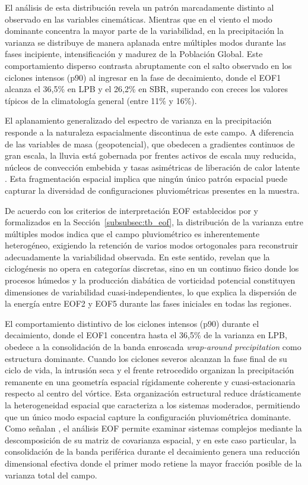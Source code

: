 El análisis de esta distribución revela un patrón marcadamente distinto al observado en las variables cinemáticas. Mientras que en el viento el modo dominante concentra la mayor parte de la variabilidad, en la precipitación la varianza se distribuye de manera aplanada entre múltiples modos durante las fases incipiente, intensificación y madurez de la Población Global.
Este comportamiento disperso contrasta abruptamente con el salto observado en los ciclones intensos (p90) al ingresar en la fase de decaimiento, donde el EOF1 alcanza el 36,5\% en LPB y el 26,2\% en SBR, superando con creces los valores típicos de la climatología general (entre 11\% y 16\%).

El aplanamiento generalizado del espectro de varianza en la precipitación responde a la naturaleza espacialmente discontinua de este campo. 
A diferencia de las variables de masa (geopotencial), que obedecen a gradientes continuos de gran escala, la lluvia está gobernada por frentes activos de escala muy reducida, núcleos de convección embebida y tasas asimétricas de liberación de calor latente \citep{oertel2021warm}. 
Esta fragmentación espacial implica que ningún único patrón espacial puede capturar la diversidad de configuraciones pluviométricas presentes en la muestra. 

De acuerdo con los criterios de interpretación EOF establecidos por \citet{hannachi2007empirical} y formalizados en la Sección~\ref{subsubsec:tb_eof}, la distribución de la varianza entre múltiples modos indica que el campo pluviométrico es inherentemente heterogéneo, exigiendo la retención de varios modos ortogonales para reconstruir adecuadamente la variabilidad observada.
En este sentido, \citet{graf2017objective} revelan que la ciclogénesis no opera en categorías discretas, sino en un continuo físico donde los procesos húmedos y la producción diabática de vorticidad potencial constituyen dimensiones de variabilidad cuasi-independientes, lo que explica la dispersión de la energía entre EOF2 y EOF5 durante las fases iniciales en todas las regiones.

El comportamiento distintivo de los ciclones intensos (p90) durante el decaimiento, donde el EOF1 concentra hasta el 36,5\% de la varianza en LPB, obedece a la consolidación de la banda enroscada \textit{wrap-around precipitation} como estructura dominante. 
Cuando los ciclones severos alcanzan la fase final de su ciclo de vida, la intrusión seca y el frente retrocedido organizan la precipitación remanente en una geometría espacial rígidamente coherente y cuasi-estacionaria respecto al centro del vórtice. 
Esta organización estructural reduce drásticamente la heterogeneidad espacial que caracteriza a los sistemas moderados, permitiendo que un único modo espacial capture la configuración pluviométrica dominante. 
Como señalan \citet{hannachi2023eof}, el análisis EOF permite examinar sistemas complejos mediante la descomposición de su matriz de covarianza espacial, y en este caso particular, la consolidación de la banda periférica durante el decaimiento genera una reducción dimensional efectiva donde el primer modo retiene la mayor fracción posible de la varianza total del campo.

